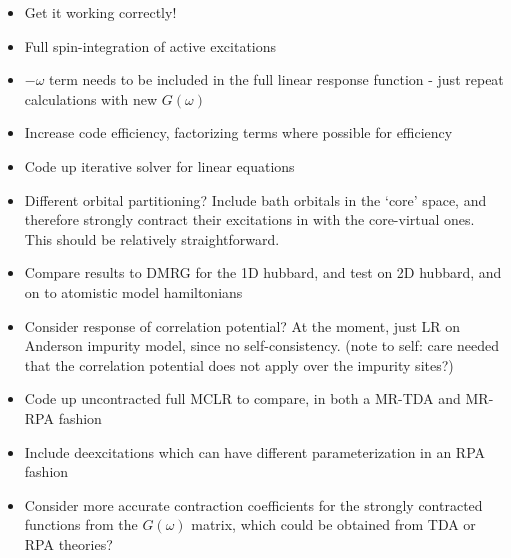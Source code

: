 \documentclass[a4paper,oneside,11pt]{article}
\numberwithin{equation}{section}
\begin{document}
\begin{itemize}
\item Get it working correctly!
\item Full spin-integration of active excitations
\item $-\omega$ term needs to be included in the full linear response function - just repeat calculations with new $G(\omega)$
\item Increase code efficiency, factorizing terms where possible for efficiency
\item Code up iterative solver for linear equations
\item Different orbital partitioning? Include bath orbitals in the `core' space, and therefore strongly contract their excitations in with the core-virtual ones. This should be relatively straightforward.
\item Compare results to DMRG for the 1D hubbard, and test on 2D hubbard, and on to atomistic model hamiltonians
\item Consider response of correlation potential? At the moment, just LR on Anderson impurity model, since no self-consistency. (note to self: care needed that the correlation potential does not apply over the impurity sites?)
\item Code up uncontracted full MCLR to compare, in both a MR-TDA and MR-RPA fashion
\item Include deexcitations which can have different parameterization in an RPA fashion
\item Consider more accurate contraction coefficients for the strongly contracted functions from the $G(\omega)$ matrix, which could be obtained from TDA or RPA theories?
\end{itemize}
\end{document}
